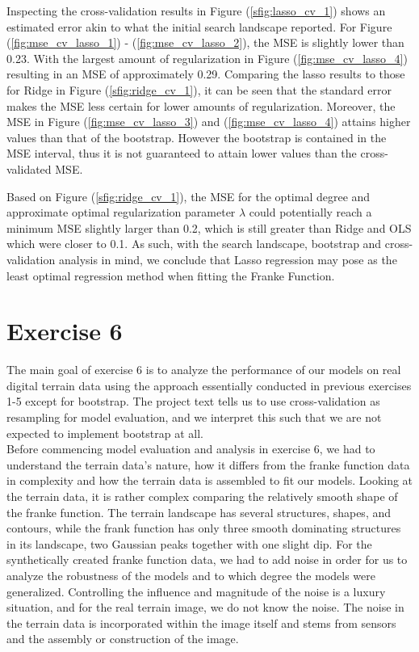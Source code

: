 \documentclass[11pt, a4paper]{article}
\begin{document}
Inspecting the cross-validation results in Figure (\ref{sfig:lasso_cv_1}) shows an estimated error akin to what the initial search landscape reported. For Figure (\ref{fig:mse_cv_lasso_1}) - (\ref{fig:mse_cv_lasso_2}), the MSE is slightly lower than 0.23. With the largest amount of regularization in Figure (\ref{fig:mse_cv_lasso_4}) resulting in an MSE of approximately 0.29. Comparing the lasso results to those for Ridge in Figure (\ref{sfig:ridge_cv_1}), it can be seen that the standard error makes the MSE less certain for lower amounts of regularization. Moreover, the MSE in Figure (\ref{fig:mse_cv_lasso_3}) and (\ref{fig:mse_cv_lasso_4}) attains higher values than that of the bootstrap. However the bootstrap is contained in the MSE interval, thus it is not guaranteed to attain lower values than the cross-validated MSE.

Based on Figure (\ref{sfig:ridge_cv_1}), the MSE for the optimal degree and approximate optimal regularization parameter $\lambda$ could potentially reach a minimum MSE slightly larger than 0.2, which is still greater than Ridge and OLS which were closer to 0.1. As such, with the search landscape, bootstrap and cross-validation analysis in mind, we conclude that Lasso regression may pose as the least optimal regression method when fitting the Franke Function.

\section*{Exercise 6}
The main goal of exercise 6 is to analyze the performance of our models on real digital terrain data using the approach essentially conducted in previous exercises
1-5 except for bootstrap. The project text tells us to use cross-validation as resampling for model evaluation, and we interpret this such that we are not expected
to implement bootstrap at all. \\
Before commencing model evaluation and analysis in exercise 6, we had to understand the terrain data's nature, how it differs from the franke function data in
complexity and how the terrain data is assembled to fit our models. Looking at the terrain data, it is rather complex comparing the relatively smooth shape of the
franke function. The terrain landscape has several structures, shapes, and contours, while the frank function has only three smooth dominating structures in its landscape,
two Gaussian peaks together with one slight dip. For the synthetically created franke function data, we had to add noise in order for us to analyze the robustness of
the models and to which degree the models were generalized. Controlling the influence and magnitude of the noise is a luxury situation, and for the real terrain image,
we do not know the noise. The noise in the terrain data is incorporated within the image itself and stems from sensors and the assembly or construction of the image.
\end{document}
